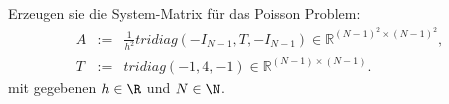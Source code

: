 \begin{aufg}[0]
  Erzeugen sie die System-Matrix für das Poisson Problem:
 \begin{eqnarray*} 
   A & := & \frac{1}{h^2} tridiag(-I_{N-1}, T, -I_{N-1}) \in \mathbb{R}^{(N-1)^2
    \times (N-1)^2},\\
     T & := & tridiag(-1,4,-1) \in \mathbb{R}^{(N-1)\times (N-1)}. 
   \end{eqnarray*}
mit gegebenen $h \in \R$ und $N \in \N$.
\end{aufg}
